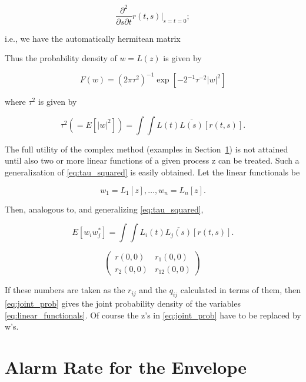 \documentclass[10pt,twocolumn]{article}
\theoremstyle{definition}
\begin{document}
\begin{equation}
\frac{\partial^2}{\partial s \partial t} r(t, s)\big|_{s=t=0};
\end{equation}

i.e., we have the automatically hermitean matrix

Thus the probability density of $w = L(z)$ is given by

\begin{equation}
\label{eq:prob_density_w}
F(w) = (2\pi\tau^2)^{-1} \exp [-2^{-1}\tau^{-2} |w|^2]
\end{equation}

where $\tau^2$ is given by

\begin{equation}
\label{eq:tau_squared}
\tau^2(=E[|w|^2]) = \int\int L(t)\overline{L(s)} [r(t, s)].
\end{equation}

The full utility of the complex method (examples in Section~\ref{sec:alarm_rate}) is not attained until also two or more linear functions of a given process z can be treated. Such a generalization of \eqref{eq:tau_squared} is easily obtained. Let the linear functionals be

\begin{equation}
\label{eq:linear_functionals}
w_1 = L_1[z], \ldots, w_n = L_n[z].
\end{equation}

Then, analogous to, and generalizing \eqref{eq:tau_squared},

\begin{equation}
\label{eq:expected_wi_wj}
E[w_i w_j^*] = \int\int L_i(t) \overline{L_j(s)} [r(t, s)].
\end{equation}

\begin{equation}
\label{eq:matrix}
\begin{pmatrix}
r(0, 0) & r_1(0, 0) \\
r_2(0, 0) & r_{12}(0, 0)
\end{pmatrix}
\end{equation}

If these numbers are taken as the $r_{ij}$ and the $q_{ij}$ calculated in terms of them, then \eqref{eq:joint_prob} gives the joint probability density of the variables \eqref{eq:linear_functionals}. Of course the z's in \eqref{eq:joint_prob} have to be replaced by w's.

\section{Alarm Rate for the Envelope}
\label{sec:alarm_rate}
\end{document}
